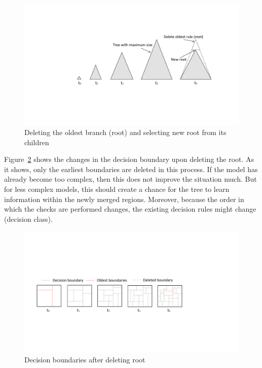 \begin{figure}[htbp]
    \begin{center}
        \includegraphics[width=14.0cm]{figs/deleteroot.pdf}
        \caption{Deleting the oldest branch (root) and selecting new root from its children}
        \label{fig:algo:delroot}
    \end{center}
\end{figure}

Figure~\ref{fig:algo:delrootdb} shows the changes in the decision boundary upon deleting the root. As it shows, only the earliest boundaries are deleted in this process. If the model has already become too complex, then this does not improve the situation much. But for less complex models, this should create a chance for the tree to learn information within the newly merged regions. Moreover, because the order in which the checks are performed changes, the existing decision rules might change (decision class).

\begin{figure}[htbp]
    \begin{center}
        \includegraphics[width=14.0cm]{figs/deleterootdb.pdf}
        \caption{Decision boundaries after deleting root}
        \label{fig:algo:delrootdb}
    \end{center}
\end{figure}


